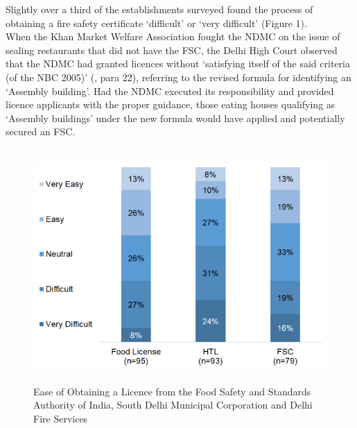 \documentclass[a4paper, 12pt]{article}
\begin{document}
		Slightly over a third of the establishments surveyed found the process of obtaining a fire safety certificate ‘difficult’ or ‘very difficult’ (Figure 1). \\
		
		When the Khan Market Welfare Association fought the NDMC on the issue of sealing restaurants that did not have the FSC, the Delhi High Court observed that the NDMC had granted licences without ‘satisfying itself of the said criteria (of the NBC 
2005)’ (\cite{dhc2016_kmwavndmc}, para 22), referring to the revised formula for identifying an ‘Assembly building’. Had the NDMC executed its responsibility and provided licence applicants with the proper 
guidance, those eating houses qualifying as ‘Assembly buildings’ under the new formula would have applied and potentially secured an FSC. \\%
		\begin{figure}[H]
                    	\centering
                    	\includegraphics[height = 3.5in]{Figure1.png}
                    	\caption[Optional Caption]{Ease of Obtaining a Licence from the Food Safety and Standards Authority of India, South Delhi Municipal Corporation and Delhi Fire Services}
		\end{figure}
                
\end{document}
